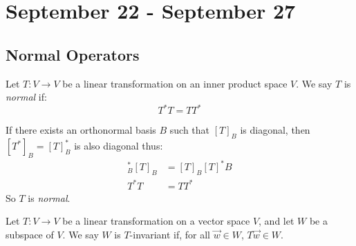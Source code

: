 \chapter{September 22 - September 27}

\section{Normal Operators}

\begin{definition}
  Let $T : V \to V$ be a linear transformation on an inner product space $V$.
  We say $T$ is \emph{normal} if:
  $$T^* T = T T^*$$
\end{definition}

\begin{remark}
  If there exists an orthonormal basis $B$ such that $[T]_B$ is diagonal,
  then $[T^*]_B = [T]^*_B$ is also diagonal thus:
  \begin{align}
    [T]^*_B [T]_B &= [T]_B[T]^*B \\
             T^*T &= T T^*
  \end{align}
  So $T$ is \emph{normal}.
\end{remark}

\begin{definition}
  Let $T : V \to V$ be a linear transformation on a vector space $V$,
  and let $W$ be a subspace of $V$. We say $W$ is $T$-invariant if,
  for all $\vec w \in W$, $T\vec w \in W$.
\end{definition}

